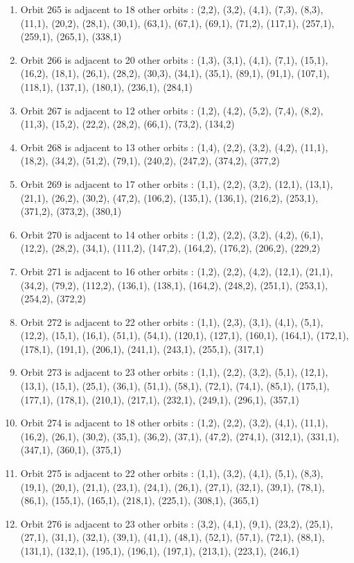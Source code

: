 \documentclass[12pt]{article}
\begin{document}
\begin{enumerate}
\item Orbit 265 is adjacent to 18 other orbits : (2,2), (3,2), (4,1), (7,3), (8,3), (11,1), (20,2), (28,1), (30,1), (63,1), (67,1), (69,1), (71,2), (117,1), (257,1), (259,1), (265,1), (338,1)
\item Orbit 266 is adjacent to 20 other orbits : (1,3), (3,1), (4,1), (7,1), (15,1), (16,2), (18,1), (26,1), (28,2), (30,3), (34,1), (35,1), (89,1), (91,1), (107,1), (118,1), (137,1), (180,1), (236,1), (284,1)
\item Orbit 267 is adjacent to 12 other orbits : (1,2), (4,2), (5,2), (7,4), (8,2), (11,3), (15,2), (22,2), (28,2), (66,1), (73,2), (134,2)
\item Orbit 268 is adjacent to 13 other orbits : (1,4), (2,2), (3,2), (4,2), (11,1), (18,2), (34,2), (51,2), (79,1), (240,2), (247,2), (374,2), (377,2)
\item Orbit 269 is adjacent to 17 other orbits : (1,1), (2,2), (3,2), (12,1), (13,1), (21,1), (26,2), (30,2), (47,2), (106,2), (135,1), (136,1), (216,2), (253,1), (371,2), (373,2), (380,1)
\item Orbit 270 is adjacent to 14 other orbits : (1,2), (2,2), (3,2), (4,2), (6,1), (12,2), (28,2), (34,1), (111,2), (147,2), (164,2), (176,2), (206,2), (229,2)
\item Orbit 271 is adjacent to 16 other orbits : (1,2), (2,2), (4,2), (12,1), (21,1), (34,2), (79,2), (112,2), (136,1), (138,1), (164,2), (248,2), (251,1), (253,1), (254,2), (372,2)
\item Orbit 272 is adjacent to 22 other orbits : (1,1), (2,3), (3,1), (4,1), (5,1), (12,2), (15,1), (16,1), (51,1), (54,1), (120,1), (127,1), (160,1), (164,1), (172,1), (178,1), (191,1), (206,1), (241,1), (243,1), (255,1), (317,1)
\item Orbit 273 is adjacent to 23 other orbits : (1,1), (2,2), (3,2), (5,1), (12,1), (13,1), (15,1), (25,1), (36,1), (51,1), (58,1), (72,1), (74,1), (85,1), (175,1), (177,1), (178,1), (210,1), (217,1), (232,1), (249,1), (296,1), (357,1)
\item Orbit 274 is adjacent to 18 other orbits : (1,2), (2,2), (3,2), (4,1), (11,1), (16,2), (26,1), (30,2), (35,1), (36,2), (37,1), (47,2), (274,1), (312,1), (331,1), (347,1), (360,1), (375,1)
\item Orbit 275 is adjacent to 22 other orbits : (1,1), (3,2), (4,1), (5,1), (8,3), (19,1), (20,1), (21,1), (23,1), (24,1), (26,1), (27,1), (32,1), (39,1), (78,1), (86,1), (155,1), (165,1), (218,1), (225,1), (308,1), (365,1)
\item Orbit 276 is adjacent to 23 other orbits : (3,2), (4,1), (9,1), (23,2), (25,1), (27,1), (31,1), (32,1), (39,1), (41,1), (48,1), (52,1), (57,1), (72,1), (88,1), (131,1), (132,1), (195,1), (196,1), (197,1), (213,1), (223,1), (246,1)

\end{enumerate}
\end{document}
